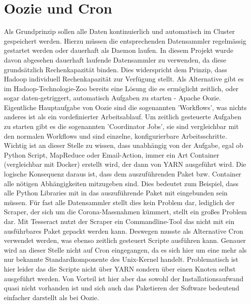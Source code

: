 \documentclass[12pt,oneside,a4paper,parskip]{scrbook}
\begin{document}
\section{Oozie und Cron}  \label{ooziecron}
Als Grundprinzip sollen alle Daten kontinuierlich und automatisch im Cluster gespeichert werden. Hierzu m\"ussen die entsprechenden Datensammler regelm\"assig gestartet werden oder dauerhaft als Daemon laufen. In diesem Projekt wurde davon abgesehen dauerhaft laufende Datensammler zu verwenden, da diese grunds\"atzlich Rechenkapazit\"at binden. Dies widerspricht dem Prinzip, dass Hadoop individuell Rechenkapazit\"at zur Verf\"ugung stellt.\newline
Als Alternative gibt es im Hadoop-Technologie-Zoo bereits eine L\"osung die es erm\"oglicht zeitlich, oder sogar daten-getriggert, automatisch Aufgaben zu starten - Apache Oozie. Eigentliche Hauptaufgabe von Oozie sind die sogenannten 'Workflows', was nichts anderes ist als ein vordefinierter Arbeitsablauf. Um zeitlich gesteuerte Aufgaben zu starten gibt es die sogenannten 'Coordinator Jobs', sie sind vergleichbar mit den normalen Workflows und sind einzelne, konfigurierbare Arbeitsschritte. Wichtig ist an dieser Stelle zu wissen, dass unabh\"angig von der Aufgabe, egal ob Python Script, MapReduce oder Email-Action, immer ein Art Container (vergleichbar mit Docker) erstellt wird, der dann von YARN ausgef\"uhrt wird. \newline
Die logische Konsequenz daraus ist, dass dem auszuf\"uhrenden Paket bzw. Container alle n\"otigen Abh\"angigkeiten mitzugeben sind. Dies bedeutet zum Beispiel, dass alle Python Libraries mit in das auszuf\"uhrende Paket mit eingebunden sein m\"ussen. F\"ur fast alle Datensammler stellt dies kein Problem dar, lediglich der Scraper, der sich um die Corona-Massnahmen k\"ummert, stellt ein großes Problem dar. Mit Tesseract nutzt der Scraper ein Commandline-Tool das nicht mit ein ausf\"uhrbares Paket gepackt werden kann. \newline
Deswegen musste als Alternative Cron verwendet werden, was ebenso zeitlich gesteuert Scripte ausf\"uhren kann. Genauer wird an dieser Stelle nicht auf Cron eingegangen, da es sich hier um eine mehr als nur bekannte Standardkomponente des Unix-Kernel handelt. Problematisch ist hier leider das die Scripte nicht \"uber YARN sondern \"uber einen Knoten selbst ausgef\"uhrt werden. Von Vorteil ist hier aber das sowohl der Installationsaufwand quasi nicht vorhanden ist und sich auch das Paketieren der Software bedeutend einfacher darstellt als bei Oozie.
\pagebreak
\end{document}
